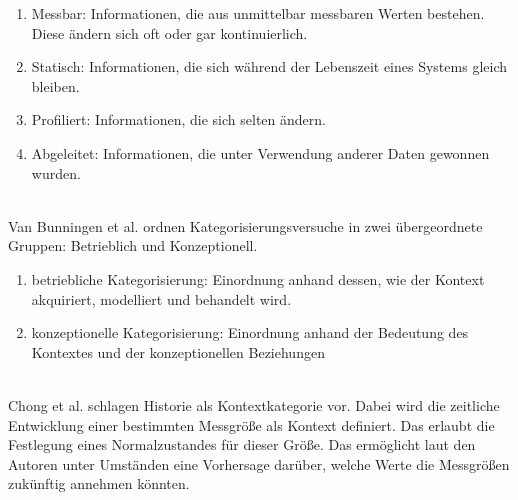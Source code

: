 \begin{enumerate}
\item {Messbar: Informationen, die aus unmittelbar messbaren Werten bestehen. Diese ändern sich oft oder gar kontinuierlich. }
\item {Statisch: Informationen, die sich während der Lebenszeit eines Systems gleich bleiben.}
\item {Profiliert: Informationen, die sich selten ändern.}
\item {Abgeleitet: Informationen, die unter Verwendung anderer Daten gewonnen wurden. }
\end{enumerate}\\
Van Bunningen et al. \cite{van2005context} ordnen Kategorisierungsversuche in zwei übergeordnete Gruppen: Betrieblich und Konzeptionell. 
\begin{enumerate}
\item{betriebliche Kategorisierung: Einordnung anhand dessen, wie der Kontext akquiriert, modelliert und behandelt wird.}
\item{konzeptionelle Kategorisierung: Einordnung anhand der Bedeutung des Kontextes und der konzeptionellen Beziehungen}
\end{enumerate}\\
Chong et al. \cite{chong_context-aware_nodate} schlagen Historie als Kontextkategorie vor. Dabei wird die zeitliche Entwicklung einer bestimmten Messgröße als Kontext definiert. Das erlaubt die Festlegung eines Normalzustandes für dieser Größe. Das ermöglicht laut den Autoren unter Umständen eine Vorhersage darüber, welche Werte die Messgrößen zukünftig annehmen könnten.


